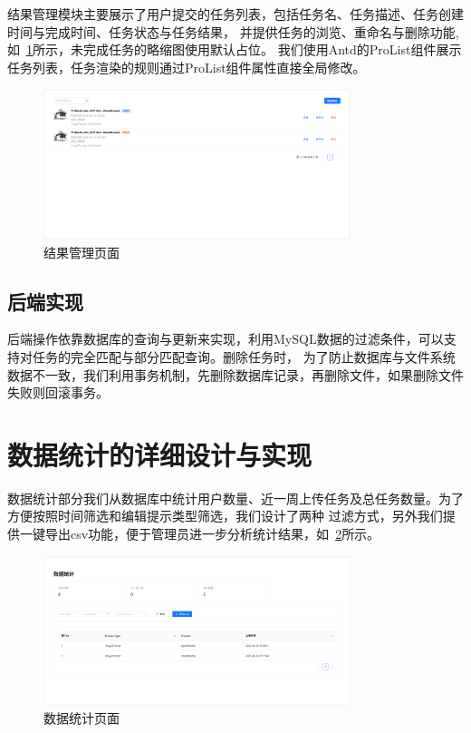 结果管理模块主要展示了用户提交的任务列表，包括任务名、任务描述、任务创建时间与完成时间、任务状态与任务结果，
并提供任务的浏览、重命名与删除功能,如~\ref{fig:app-result}所示，未完成任务的略缩图使用默认占位。
我们使用Antd的ProList组件展示任务列表，任务渲染的规则通过ProList组件属性直接全局修改。

\begin{figure}[ht]
    \centering
    \includegraphics[width=0.8\textwidth]{source/img/app_result.png}
    \caption{结果管理页面}
    \label{fig:app-result}
\end{figure}

\subsection{后端实现}

后端操作依靠数据库的查询与更新来实现，利用MySQL数据的过滤条件，可以支持对任务的完全匹配与部分匹配查询。删除任务时，
为了防止数据库与文件系统数据不一致，我们利用事务机制，先删除数据库记录，再删除文件，如果删除文件失败则回滚事务。

\section{数据统计的详细设计与实现}

数据统计部分我们从数据库中统计用户数量、近一周上传任务及总任务数量。为了方便按照时间筛选和编辑提示类型筛选，我们设计了两种
过滤方式，另外我们提供一键导出csv功能，便于管理员进一步分析统计结果，如~\ref{fig:app-admin}所示。

\begin{figure}[ht]
    \centering
    \includegraphics[width=0.8\textwidth]{source/img/app_admin.png}
    \caption{数据统计页面}
    \label{fig:app-admin}
\end{figure}

